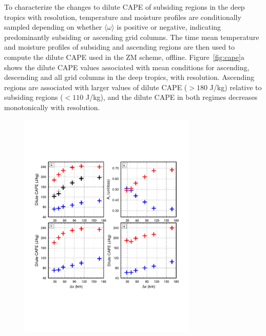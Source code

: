 \documentclass[times]{qjrms4}
\begin{document}
To characterize the changes to dilute CAPE of subsiding regions in the deep tropics with resolution, temperature and moisture profiles are conditionally sampled depending on whether $\langle \omega \rangle$ is positive or negative, indicating predominantly subsiding or ascending grid columns. The time mean temperature and moisture profiles of subsiding and ascending regions are then used to compute the dilute CAPE used in the ZM scheme, offline. Figure~\ref{fig:cape}a shows the dilute CAPE values associated with mean conditions for ascending, descending and all grid columns in the deep tropics, with resolution. Ascending regions are associated with larger values of dilute CAPE ($>180$ J/kg) relative to subsiding regions ($<110$ J/kg), and the dilute CAPE in both regimes decreases monotonically with resolution. 

\begin{figure}
\begin{center}
\noindent\includegraphics[width=20pc,angle=0]{figs/temp_cape.pdf}\\

\end{center}
\end{figure}
\end{document}
